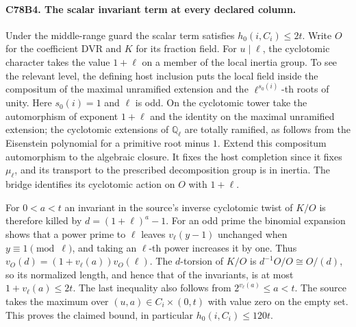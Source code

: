 \paragraph{C78B4. The scalar invariant term at every declared column.}
Under the middle-range guard the scalar term satisfies
$h_0(i,C_i)\le2t$. Write $O$ for the coefficient DVR and $K$ for
its fraction field. For $u\mid\ell$, the cyclotomic character takes
the value $1+\ell$ on a member of the local inertia group. To see
the relevant level, the defining host inclusion puts the local field
inside the compositum of the maximal unramified extension and
the $\ell^{s_0(i)}$-th roots of unity. Here $s_0(i)=1$ and $\ell$
is odd. On the cyclotomic tower take the automorphism of exponent
$1+\ell$ and the identity on the maximal unramified extension; the
cyclotomic extensions of $\mathbb Q_\ell$ are totally ramified,
as follows from the Eisenstein polynomial for a primitive root
minus $1$. Extend this compositum automorphism to the algebraic
closure. It fixes the host completion since it fixes $\mu_\ell$,
and its transport to the prescribed decomposition group is in inertia.
The bridge identifies its cyclotomic action on $O$ with $1+\ell$.

For $0<a<t$ an invariant in the source's inverse cyclotomic twist
of $K/O$ is therefore killed by $d=(1+\ell)^a-1$. For an odd prime
the binomial expansion shows that a power prime to $\ell$ leaves
$v_\ell(y-1)$ unchanged when $y\equiv1\pmod\ell$, and taking an
$\ell$-th power increases it by one. Thus
$v_O(d)=(1+v_\ell(a))v_O(\ell)$. The $d$-torsion of $K/O$ is
$d^{-1}O/O\cong O/(d)$, so its normalized length, and hence that
of the invariants, is at most $1+v_\ell(a)\le2t$. The last
inequality also follows from $2^{v_\ell(a)}\le a<t$.
The source takes the maximum over $(u,a)\in C_i\times(0,t)$
with value zero on the empty set. This proves the claimed bound,
in particular $h_0(i,C_i)\le120t$.


